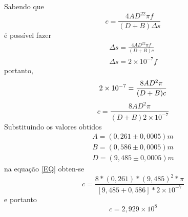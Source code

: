 Sabendo que
\begin{equation}
	c = \frac{4AD^22\pi f}{(D+B)\Delta s}
\end{equation}
é possível fazer
\begin{equation}
\begin{split}
	\Delta s = \frac{4AD^22\pi f}{(D+B)c}\\
	\Delta s = 2\times10^{-7}f
\end{split}
\end{equation}
portanto,
\begin{equation}
	2\times10^{-7}=\frac{8AD^2\pi}{(D+B)c}\\
\end{equation}
\begin{equation}
	c=\frac{8AD^2\pi}{(D+B)2\times10^{-7}}
\label{EQ}
\end{equation}
Substituindo os valores obtidos
\begin{equation}
	\begin{split}
		A = (0,261\pm0,0005)m\\
		B = (0,586\pm0,0005)m\\
		D = (9,485\pm0,0005)m
	\end{split}
\end{equation}
na equação \ref{EQ} obten-se
\begin{equation}
	c=\frac{8*(0,261)*(9,485)^2*\pi}{[9,485+0,586]*2\times10^{-7}}
\end{equation}
e portanto
\begin{equation}
	c=2,929\times10^{8}
\end{equation}
\cite{atalho}
